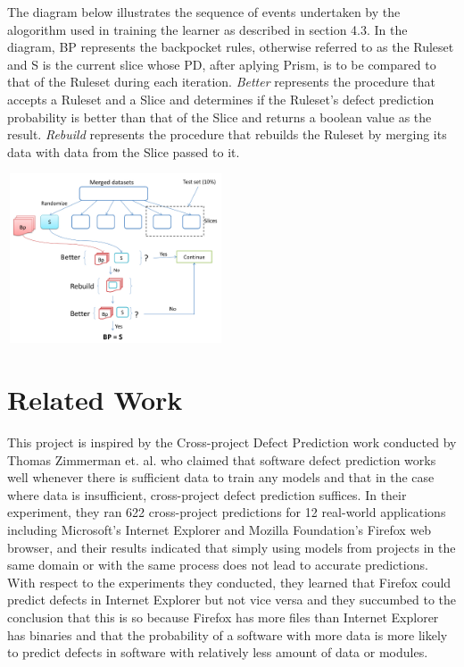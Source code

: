 \documentclass{sig-alternate}
\begin{document}
The diagram below illustrates the sequence of events undertaken by the alogorithm used in training the learner as described in section 4.3. In the diagram, BP represents the backpocket rules, otherwise referred to as the Ruleset and S is the current slice whose PD, after aplying Prism, is to be compared to that of the Ruleset during each iteration. {\em Better} represents the procedure that accepts a Ruleset and a Slice and determines if the Ruleset's defect prediction probability is better than that of the Slice and returns a boolean value as the result. {\em Rebuild} represents the procedure that rebuilds the Ruleset by merging its data with data from the Slice passed to it.

\includegraphics[width=243, height=190]{flowchart.png}



\section{Related Work}
This project is inspired by the Cross-project Defect Prediction work conducted by Thomas Zimmerman et. al. who claimed that software defect prediction works well whenever there is sufficient data to train any models and that in the case where data is insufficient, cross-project defect prediction suffices\cite{zimmerman09}. In their experiment, they ran 622 cross-project predictions for 12 real-world applications including Microsoft's Internet Explorer and Mozilla Foundation's Firefox web browser, and their results indicated that simply using models from projects in the same domain or with the same process does not lead to accurate predictions. With respect to the experiments they conducted, they learned that Firefox could predict defects in Internet Explorer but not vice versa and they succumbed to the conclusion that this is so because Firefox has more files than Internet Explorer has binaries and that the probability of a software with more data is more likely to predict defects in software with relatively less amount of data or modules.
\end{document}
